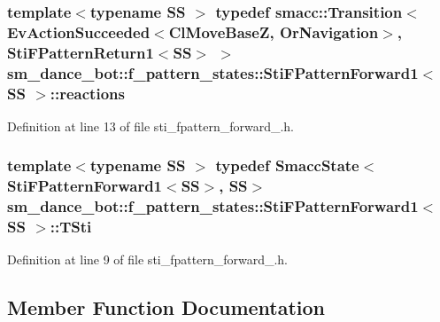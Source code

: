 \subsubsection[{\texorpdfstring{reactions}{reactions}}]{\setlength{\rightskip}{0pt plus 5cm}template$<$typename SS $>$ typedef {\bf smacc\+::\+Transition}$<$Ev\+Action\+Succeeded$<${\bf Cl\+Move\+BaseZ}, {\bf Or\+Navigation}$>$, {\bf Sti\+F\+Pattern\+Return1}$<$SS$>$ $>$ {\bf sm\+\_\+dance\+\_\+bot\+::f\+\_\+pattern\+\_\+states\+::\+Sti\+F\+Pattern\+Forward1}$<$ SS $>$\+::{\bf reactions}}\hypertarget{structsm__dance__bot_1_1f__pattern__states_1_1StiFPatternForward1_adea4360b0d236b8e8af58c452630380f}{}\label{structsm__dance__bot_1_1f__pattern__states_1_1StiFPatternForward1_adea4360b0d236b8e8af58c452630380f}


Definition at line 13 of file sti\+\_\+fpattern\+\_\+forward\+\_.\+h.

\subsubsection[{\texorpdfstring{T\+Sti}{TSti}}]{\setlength{\rightskip}{0pt plus 5cm}template$<$typename SS $>$ typedef {\bf Smacc\+State}$<${\bf Sti\+F\+Pattern\+Forward1}$<$SS$>$, SS$>$ {\bf sm\+\_\+dance\+\_\+bot\+::f\+\_\+pattern\+\_\+states\+::\+Sti\+F\+Pattern\+Forward1}$<$ SS $>$\+::{\bf T\+Sti}}\hypertarget{structsm__dance__bot_1_1f__pattern__states_1_1StiFPatternForward1_a7dff4a86e12407b2daf0d34aba22d21b}{}\label{structsm__dance__bot_1_1f__pattern__states_1_1StiFPatternForward1_a7dff4a86e12407b2daf0d34aba22d21b}


Definition at line 9 of file sti\+\_\+fpattern\+\_\+forward\+\_.\+h.



\subsection{Member Function Documentation}
